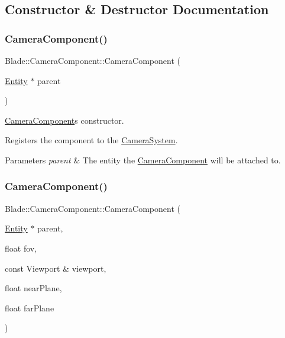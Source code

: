 \subsection{Constructor \& Destructor Documentation}
\mbox{\label{class_blade_1_1_camera_component_a6f66ead0c16432f9840070d40236f099}} 
\subsubsection{\texorpdfstring{Camera\+Component()}{CameraComponent()}\hspace{0.1cm}{\footnotesize\ttfamily [1/3]}}
{\footnotesize\ttfamily Blade\+::\+Camera\+Component\+::\+Camera\+Component (\begin{DoxyParamCaption}\item[{\hyperlink{class_blade_1_1_entity}{Entity} $\ast$}]{parent }\end{DoxyParamCaption})\hspace{0.3cm}{\ttfamily [explicit]}}



\hyperlink{class_blade_1_1_camera_component}{Camera\+Component}\textquotesingle{}s constructor. 

Registers the component to the \hyperlink{class_blade_1_1_camera_system}{Camera\+System}. 
\begin{DoxyParams}{Parameters}
{\em parent} & The entity the \hyperlink{class_blade_1_1_camera_component}{Camera\+Component} will be attached to. \\
\hline
\end{DoxyParams}
\mbox{\label{class_blade_1_1_camera_component_aeb0111051de5e6156dde78ec88cf5afe}} 
\subsubsection{\texorpdfstring{Camera\+Component()}{CameraComponent()}\hspace{0.1cm}{\footnotesize\ttfamily [2/3]}}
{\footnotesize\ttfamily Blade\+::\+Camera\+Component\+::\+Camera\+Component (\begin{DoxyParamCaption}\item[{\hyperlink{class_blade_1_1_entity}{Entity} $\ast$}]{parent,  }\item[{float}]{fov,  }\item[{const Viewport \&}]{viewport,  }\item[{float}]{near\+Plane,  }\item[{float}]{far\+Plane }\end{DoxyParamCaption})}

